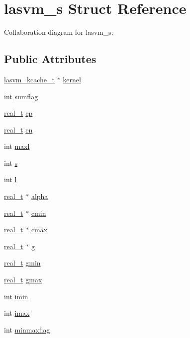 \hypertarget{structlasvm__s}{\section{lasvm\+\_\+s Struct Reference}
\label{structlasvm__s}
}


Collaboration diagram for lasvm\+\_\+s\+:
\subsection*{Public Attributes}
\begin{DoxyCompactItemize}
\item 
\hyperlink{kcache_8h_a62ba64635f69e07a6f3a206fcee926a0}{lasvm\+\_\+kcache\+\_\+t} $\ast$ \hyperlink{structlasvm__s_afa4b3de1cb3897ccc8dd9841fb5ec926}{kernel}
\item 
int \hyperlink{structlasvm__s_a27169eb8896da9095e4a6c456c19e2a3}{sumflag}
\item 
\hyperlink{lasvm_8c_a6675a3ab28312a8835980fffa55e7fba}{real\+\_\+t} \hyperlink{structlasvm__s_aebbca80afbde39cdf064cc534c6ded50}{cp}
\item 
\hyperlink{lasvm_8c_a6675a3ab28312a8835980fffa55e7fba}{real\+\_\+t} \hyperlink{structlasvm__s_a3b00e77d65c9a6c2f983bcffd41f466f}{cn}
\item 
int \hyperlink{structlasvm__s_a4e60fb7f603d6ce3168458078ae4ae39}{maxl}
\item 
int \hyperlink{structlasvm__s_a6df452ef26ff15a0b47c3aa2e51dfc44}{s}
\item 
int \hyperlink{structlasvm__s_ac7273f325aa9d6b7ef0ff6af4c0364ad}{l}
\item 
\hyperlink{lasvm_8c_a6675a3ab28312a8835980fffa55e7fba}{real\+\_\+t} $\ast$ \hyperlink{structlasvm__s_a6360f37d6c628bf106cfc806ad0fa61a}{alpha}
\item 
\hyperlink{lasvm_8c_a6675a3ab28312a8835980fffa55e7fba}{real\+\_\+t} $\ast$ \hyperlink{structlasvm__s_ac58d4c1cb1ae6aa94e6253bad9bd43a6}{cmin}
\item 
\hyperlink{lasvm_8c_a6675a3ab28312a8835980fffa55e7fba}{real\+\_\+t} $\ast$ \hyperlink{structlasvm__s_a56d3c6931751fb50d949d5d52f18989b}{cmax}
\item 
\hyperlink{lasvm_8c_a6675a3ab28312a8835980fffa55e7fba}{real\+\_\+t} $\ast$ \hyperlink{structlasvm__s_a45768418da49b38c41888a364986b650}{g}
\item 
\hyperlink{lasvm_8c_a6675a3ab28312a8835980fffa55e7fba}{real\+\_\+t} \hyperlink{structlasvm__s_a6a2a18341e53b318927e47384b3a9eb1}{gmin}
\item 
\hyperlink{lasvm_8c_a6675a3ab28312a8835980fffa55e7fba}{real\+\_\+t} \hyperlink{structlasvm__s_a8642d66da16fe3cd906cb2fd472335ab}{gmax}
\item 
int \hyperlink{structlasvm__s_a266838d449c91d1888a2370e6e0f5f6c}{imin}
\item 
int \hyperlink{structlasvm__s_a4bdab161b63c7d24f7d56062da0384ec}{imax}
\item 
int \hyperlink{structlasvm__s_a0a940757cf44d99e2b50848bc08fd117}{minmaxflag}
\end{DoxyCompactItemize}


